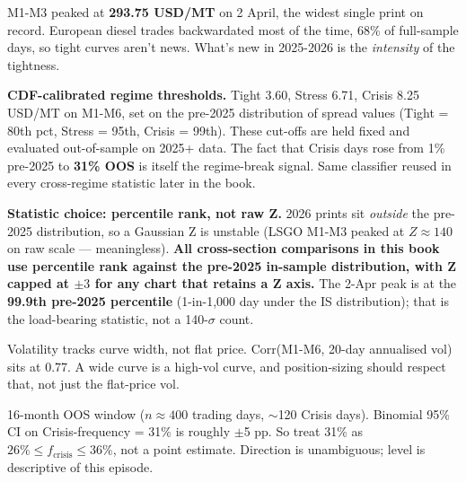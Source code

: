 \documentclass[10pt,a4paper]{article}
\begin{document}
\vspace{0.2cm}

\noindent\begin{minipage}[t]{0.42\linewidth}\vspace{0pt}

M1-M3 peaked at \textbf{293.75 USD/MT} on 2 April, the widest single print on record. European diesel trades backwardated most of the time, 68\% of full-sample days, so tight curves aren't news. What's new in 2025-2026 is the \emph{intensity} of the tightness.

\textbf{CDF-calibrated regime thresholds.} Tight 3.60, Stress 6.71, Crisis 8.25 USD/MT on M1-M6, set on the pre-2025 distribution of spread values (Tight = 80th pct, Stress = 95th, Crisis = 99th). These cut-offs are held fixed and evaluated out-of-sample on 2025+ data. The fact that Crisis days rose from 1\% pre-2025 to \textbf{31\% OOS} is itself the regime-break signal. Same classifier reused in every cross-regime statistic later in the book.

\textbf{Statistic choice: percentile rank, not raw Z.} 2026 prints sit \emph{outside} the pre-2025 distribution, so a Gaussian Z is unstable (LSGO M1-M3 peaked at $Z\approx140$ on raw scale --- meaningless). \textbf{All cross-section comparisons in this book use percentile rank against the pre-2025 in-sample distribution, with Z capped at $\pm 3$ for any chart that retains a Z axis.} The 2-Apr peak is at the \textbf{99.9th pre-2025 percentile} (1-in-1{,}000 day under the IS distribution); that is the load-bearing statistic, not a 140-$\sigma$ count.

Volatility tracks curve width, not flat price. Corr(M1-M6, 20-day annualised vol) sits at 0.77. A wide curve is a high-vol curve, and position-sizing should respect that, not just the flat-price vol.

\begin{callout}
\footnotesize
16-month OOS window ($n \approx 400$ trading days, $\sim$120 Crisis days). Binomial 95\% CI on Crisis-frequency = 31\% is roughly $\pm$5 pp. So treat 31\% as $26\% \le f_{\mathrm{crisis}} \le 36\%$, not a point estimate. Direction is unambiguous; level is descriptive of this episode.
\end{callout}

\end{minipage}\hfill
\end{document}
